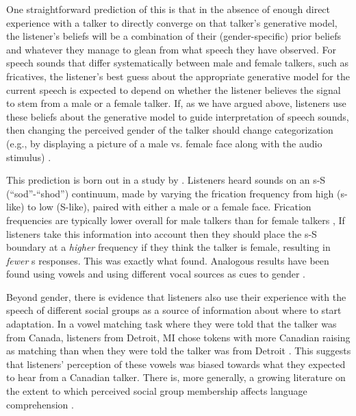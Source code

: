 One straightforward prediction of this is that in the absence of enough direct experience with a talker to directly converge on that talker's generative model, the listener's beliefs will be a combination of their (gender-specific) prior beliefs and whatever they manage to glean from what speech they have observed.  For speech sounds that differ systematically between male and female talkers, such as fricatives, the listener's best guess about the appropriate generative model for the current speech is expected to depend on whether the listener believes the signal to stem from a male or a female talker.  If, as we have argued above, listeners use these beliefs about the generative model to guide interpretation of speech sounds, then changing the perceived gender of the talker should change categorization (e.g., by displaying a picture of a male vs. female face along with the audio stimulus) .

This prediction is born out in a study by \textcite{Strand1996} \autocite[see also][]{Strand1999,Munson2011a}.  Listeners heard sounds on an \ph s-\ph S (``sod''-``shod'') continuum, made by varying the frication frequency from high (\ph s-like) to low (\ph S-like), paired with either a male or a female face.  Frication frequencies are typically lower overall for male talkers than for female talkers \cite{Jongman2000,McMurray2011a,Newman2001},  If listeners take this information into account then they should place the \ph s-\ph S boundary at a \emph{higher} frequency if they think the talker is female, resulting in \emph{fewer} \ph s responses.  This was exactly what  found.  Analogous results have been found using vowels \cite{Johnson1999} and using different vocal sources as cues to gender \cite<rather than faces>{Strand1996,Strand1999,Johnson1999,Munson2011a}.  

Beyond gender, there is evidence that listeners also use their experience with the speech of different social groups as a source of information about where to start adaptation.  In a vowel matching task where they were told that the talker was from Canada, listeners from Detroit, MI chose tokens with more Canadian raising as matching than when they were told the talker was from Detroit \cite{Niedzielski1999}.  This suggests that listeners' perception of these vowels was biased towards what they expected to hear from a Canadian talker.  There is, more generally, a growing literature on the extent to which perceived social group membership affects language comprehension \autocite{Drager2010,Hay2006,Hay2010,StaumCasasanto2008,Sidaras2014}.

